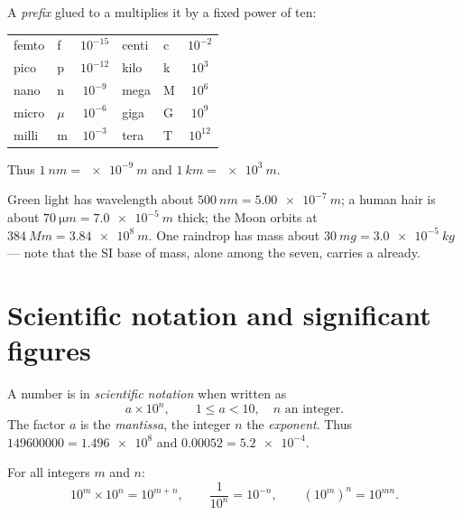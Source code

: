 \begin{definition}[SI prefixes]\label{def:g10:orders-of-magnitude:prefixes}
A \emph{prefix} glued to a  multiplies it by a
fixed power of ten:
\begin{center}
\begin{tabular}{llc@{\qquad\qquad}llc}
femto & f & $10^{-15}$ & centi & c & $10^{-2}$ \\
pico  & p & $10^{-12}$ & kilo  & k & $10^{3}$  \\
nano  & n & $10^{-9}$  & mega  & M & $10^{6}$  \\
micro & $\mu$ & $10^{-6}$ & giga & G & $10^{9}$ \\
milli & m & $10^{-3}$  & tera  & T & $10^{12}$ \\
\end{tabular}
\end{center}
Thus $\qty{1}{nm} = \qty{e-9}{m}$ and $\qty{1}{km} = \qty{e3}{m}$.
\end{definition}

\begin{example}\label{ex:g10:orders-of-magnitude:prefixes}
Green light has wavelength about $\qty{500}{nm} = \qty{5.00e-7}{m}$; a
human hair is about $\qty{70}{\micro m} = \qty{7.0e-5}{m}$ thick; the
Moon orbits at $\qty{384}{Mm} = \qty{3.84e8}{m}$. One raindrop has
mass about $\qty{30}{mg} = \qty{3.0e-5}{kg}$ --- note that the SI base
 of mass, alone among the seven, carries a  already.
\end{example}

\section{Scientific notation and significant figures}

\begin{definition}\label{def:g10:orders-of-magnitude:scinot}
A number is in \emph{scientific notation}
when written as
\[
a \times 10^{n}, \qquad 1 \leq a < 10, \quad n \text{ an integer.}
\]
The factor $a$ is the \emph{mantissa}, the integer
$n$ the \emph{exponent}.
Thus $\num{149600000} = \num{1.496e8}$ and
$\num{0.00052} = \num{5.2e-4}$.
\end{definition}

\begin{proposition}\label{prop:g10:orders-of-magnitude:powers}
For all integers $m$ and $n$:
\[
10^{m} \times 10^{n} = 10^{m+n}, \qquad
\frac{1}{10^{n}} = 10^{-n}, \qquad
\left(10^{m}\right)^{n} = 10^{mn}.
\]
\end{proposition}

